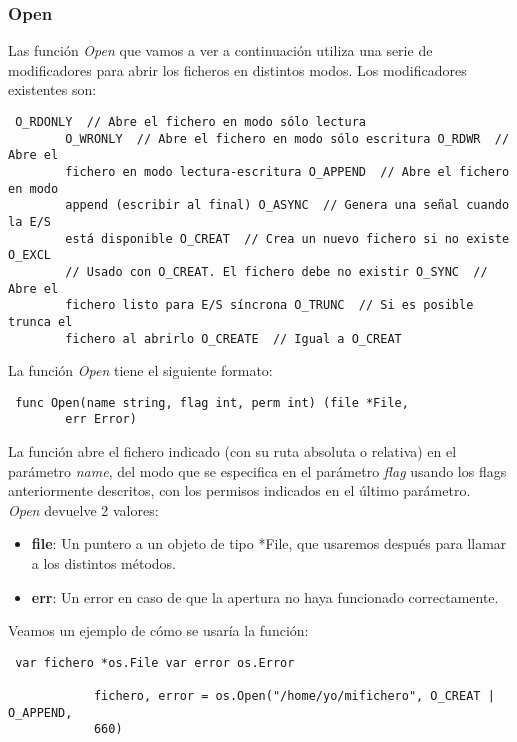 		\subsubsection{Open}
		
		Las función \textit{Open} que vamos a ver a continuación utiliza una
		serie de modificadores para abrir los ficheros en distintos modos. Los
		modificadores existentes son:
		
		\begin{verbatim} O_RDONLY  // Abre el fichero en modo sólo lectura
		O_WRONLY  // Abre el fichero en modo sólo escritura O_RDWR  // Abre el
		fichero en modo lectura-escritura O_APPEND  // Abre el fichero en modo
		append (escribir al final) O_ASYNC  // Genera una señal cuando la E/S
		está disponible O_CREAT  // Crea un nuevo fichero si no existe O_EXCL
		// Usado con O_CREAT. El fichero debe no existir O_SYNC  // Abre el
		fichero listo para E/S síncrona O_TRUNC  // Si es posible trunca el
		fichero al abrirlo O_CREATE  // Igual a O_CREAT \end{verbatim}
		
		La función \textit{Open} tiene el siguiente formato:
		
		\begin{verbatim} func Open(name string, flag int, perm int) (file *File,
		err Error) \end{verbatim}
		
		La función abre el fichero indicado (con su ruta absoluta o relativa) en
		el parámetro \textit{name}, del modo que se especifica en el parámetro
		\textit{flag} usando los flags anteriormente descritos, con los permisos
		indicados en el último parámetro.\\
		
		\textit{Open} devuelve 2 valores: \begin{itemize} \item \textbf{file}:
		Un puntero a un objeto de tipo *File, que usaremos después para llamar
		a los distintos métodos.  \item \textbf{err}: Un error en caso de que la
		apertura no haya funcionado correctamente.  \end{itemize} \clearpage
		Veamos un ejemplo de cómo se usaría la función:
		
		\begin{verbatim} var fichero *os.File var error os.Error
		    
			fichero, error = os.Open("/home/yo/mifichero", O_CREAT | O_APPEND,
			660) \end{verbatim}
		
